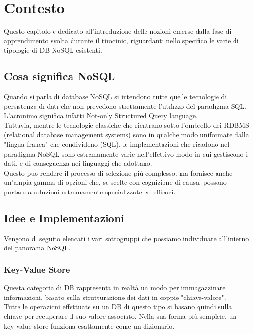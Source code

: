 
\chapter{Contesto}
\label{cap:contesto}

Questo capitolo è dedicato all'introduzione delle nozioni emerse dalla fase di apprendimento svolta durante il tirocinio, riguardanti nello specifico le varie di tipologie di DB NoSQL esistenti.\\

\section{Cosa significa NoSQL}
Quando si parla di database NoSQL si intendono tutte quelle tecnologie di persistenza di dati che non prevedono strettamente l'utilizzo del paradigma SQL. L'acronimo significa infatti Not-only Structured Query language.\\
Tuttavia, mentre le tecnologie classiche che rientrano sotto l'ombrello dei RDBMS (relational database management systems) sono in qualche modo uniformate dalla "lingua franca" che condividono (SQL), le implementazioni che ricadono nel paradigma NoSQL sono estremamente varie nell'effettivo modo in cui gestiscono i dati, e di conseguenza nei linguaggi che adottano.\\
Questo può rendere il processo di selezione più complesso, ma fornisce anche un'ampia gamma di opzioni che, se scelte con cognizione di causa, possono portare a soluzioni estremamente specializzate ed efficaci.\\


\section{Idee e Implementazioni}
Vengono di seguito elencati i vari sottogruppi che possiamo individuare all'interno del panorama NoSQL.\\

\subsection{Key-Value Store}
Questa categoria di DB rappresenta in realtà un modo per immagazzinare informazioni, basato sulla strutturazione dei dati in coppie "chiave-valore".\\
Tutte le operazioni effettuate su un DB di questo tipo si basano quindi sulla chiave per recuperare il suo valore associato. Nella sua forma più semplcie, un key-value store funziona esattamente come un dizionario.\\

